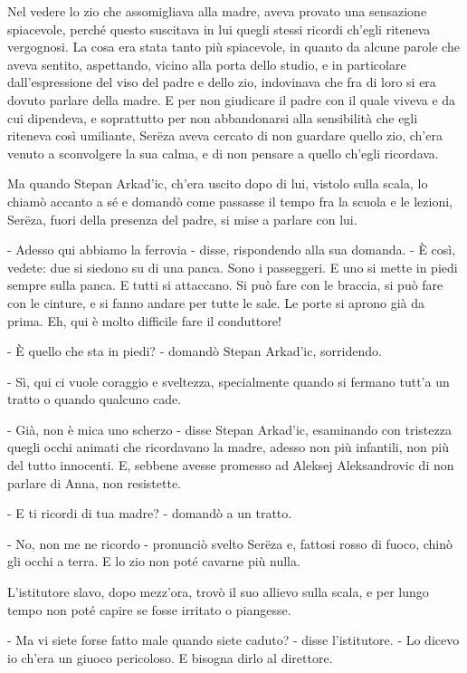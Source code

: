 Nel vedere lo zio che assomigliava alla madre, aveva provato una sensazione spiacevole, perché questo suscitava in lui quegli stessi ricordi ch'egli riteneva vergognosi. La cosa era stata tanto più spiacevole, in quanto da alcune parole che aveva sentito, aspettando, vicino alla porta dello studio, e in particolare dall'espressione del viso del padre e dello zio, indovinava che fra di loro si era dovuto parlare della madre. E per non giudicare il padre con il quale viveva e da cui dipendeva, e soprattutto per non abbandonarsi alla sensibilità che egli riteneva così umiliante, Serëza aveva cercato di non guardare quello zio, ch'era venuto a sconvolgere la sua calma, e di non pensare a quello ch'egli ricordava. 

Ma quando Stepan Arkad'ic, ch'era uscito dopo di lui, vistolo sulla scala, lo chiamò accanto a sé e domandò come passasse il tempo fra la scuola e le lezioni, Serëza, fuori della presenza del padre, si mise a parlare con lui. 

- Adesso qui abbiamo la ferrovia - disse, rispondendo alla sua domanda. - È così, vedete: due si siedono su di una panca. Sono i passeggeri. E uno si mette in piedi sempre sulla panca. E tutti si attaccano. Si può fare con le braccia, si può fare con le cinture, e si fanno andare per tutte le sale. Le porte si aprono già da prima. Eh, qui è molto difficile fare il conduttore! 

- È quello che sta in piedi? - domandò Stepan Arkad'ic, sorridendo. 

- Sì, qui ci vuole coraggio e sveltezza, specialmente quando si fermano tutt'a un tratto o quando qualcuno cade. 

- Già, non è mica uno scherzo - disse Stepan Arkad'ic, esaminando con tristezza quegli occhi animati che ricordavano la madre, adesso non più infantili, non più del tutto innocenti. E, sebbene avesse promesso ad Aleksej Aleksandrovic di non parlare di Anna, non resistette. 

- E ti ricordi di tua madre? - domandò a un tratto. 

- No, non me ne ricordo - pronunciò svelto Serëza e, fattosi rosso di fuoco, chinò gli occhi a terra. E lo zio non poté cavarne più nulla. 

L'istitutore slavo, dopo mezz'ora, trovò il suo allievo sulla scala, e per lungo tempo non poté capire se fosse irritato o piangesse. 
\enlargethispage*{1\baselineskip}

- Ma vi siete forse fatto male quando siete caduto? - disse l'istitutore. - Lo dicevo io ch'era un giuoco pericoloso. E bisogna dirlo al direttore. 


